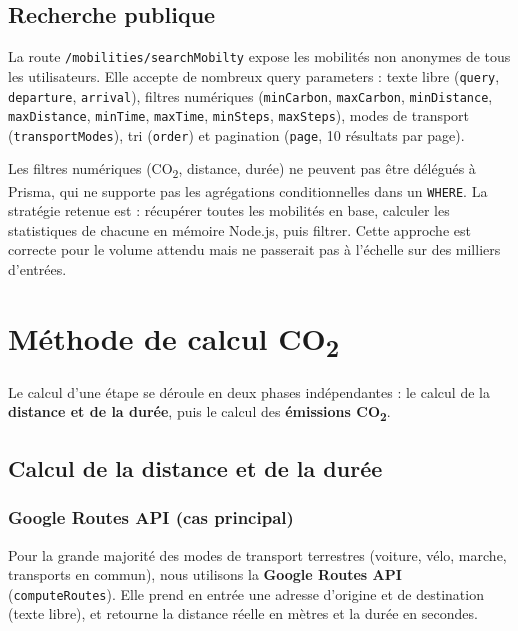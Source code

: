 \documentclass[11pt,a4paper]{article}
\begin{document}
\subsection{Recherche publique}
\label{sec:recherche}

La route \texttt{/mobilities/searchMobilty} expose les mobilités non anonymes de tous les utilisateurs. Elle accepte de nombreux query parameters : texte libre (\texttt{query}, \texttt{departure}, \texttt{arrival}), filtres numériques (\texttt{minCarbon}, \texttt{maxCarbon}, \texttt{minDistance}, \texttt{maxDistance}, \texttt{minTime}, \texttt{maxTime}, \texttt{minSteps}, \texttt{maxSteps}), modes de transport (\texttt{transportModes}), tri (\texttt{order}) et pagination (\texttt{page}, 10 résultats par page).

\begin{warnbox}[title={Filtrage en mémoire}]
Les filtres numériques (CO\textsubscript{2}, distance, durée) ne peuvent pas être délégués à Prisma, qui ne supporte pas les agrégations conditionnelles dans un \texttt{WHERE}. La stratégie retenue est : récupérer toutes les mobilités en base, calculer les statistiques de chacune en mémoire Node.js, puis filtrer. Cette approche est correcte pour le volume attendu mais ne passerait pas à l'échelle sur des milliers d'entrées.
\end{warnbox}

\newpage
\section{Méthode de calcul CO\textsubscript{2}}
\label{sec:calcul}

Le calcul d'une étape se déroule en deux phases indépendantes : le calcul de la \textbf{distance et de la durée}, puis le calcul des \textbf{émissions CO\textsubscript{2}}.

\subsection{Calcul de la distance et de la durée}

\subsubsection*{Google Routes API (cas principal)}

Pour la grande majorité des modes de transport terrestres (voiture, vélo, marche, transports en commun), nous utilisons la \textbf{Google Routes API} (\texttt{computeRoutes}). Elle prend en entrée une adresse d'origine et de destination (texte libre), et retourne la distance réelle en mètres et la durée en secondes.
\end{document}

